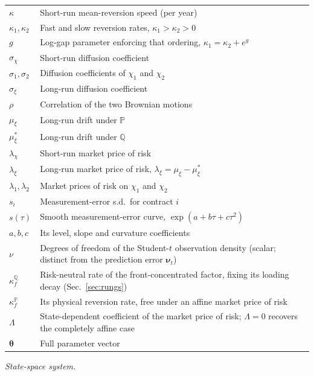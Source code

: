 \documentclass[journal]{IEEEtran}
\begin{document}
\smallskip
\begin{tabular}{@{}p{2.0cm}@{}p{5.95cm}@{}}
$\kappa$           & Short-run mean-reversion speed (per year) \\
$\kappa_1,\kappa_2$& Fast and slow reversion rates, $\kappa_1 > \kappa_2 > 0$ \\
$g$                & Log-gap parameter enforcing that ordering, $\kappa_1 = \kappa_2 + e^{g}$ \\
$\sigma_\chi$      & Short-run diffusion coefficient \\
$\sigma_1,\sigma_2$& Diffusion coefficients of $\chi_1$ and $\chi_2$ \\
$\sigma_\xi$       & Long-run diffusion coefficient \\
$\rho$             & Correlation of the two Brownian motions \\
$\mu_\xi$          & Long-run drift under $\mathbb{P}$ \\
$\mu_\xi^{*}$      & Long-run drift under $\mathbb{Q}$ \\
$\lambda_\chi$     & Short-run market price of risk \\
$\lambda_\xi$      & Long-run market price of risk, $\lambda_\xi = \mu_\xi - \mu_\xi^{*}$ \\
$\lambda_1,\lambda_2$ & Market prices of risk on $\chi_1$ and $\chi_2$ \\
$s_i$              & Measurement-error s.d.\ for contract $i$ \\
$s(\tau)$          & Smooth measurement-error curve, $\exp(a + b\tau + c\tau^{2})$ \\
$a,b,c$            & Its level, slope and curvature coefficients \\
$\nu$              & Degrees of freedom of the Student-$t$ observation density (scalar; distinct from the prediction error $\bm{\nu}_t$) \\
$\kappa_f^{\mathbb{Q}}$ & Risk-neutral rate of the front-concentrated factor, fixing its loading decay (Sec.~\ref{sec:rungs}) \\
$\kappa_f^{\mathbb{P}}$ & Its physical reversion rate, free under an affine market price of risk \\
$\Lambda$          & State-dependent coefficient of the market price of risk; $\Lambda = 0$ recovers the completely affine case \\
$\bm{\theta}$      & Full parameter vector \\
\end{tabular}

\smallskip
\noindent\textit{State-space system.}
\end{document}
